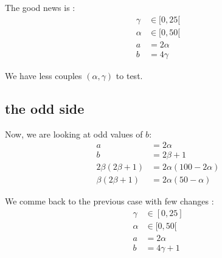 The good news is : 
\begin{equation}\label{eq:pow2:5}
\begin{split}
	\gamma &\in [0, 25[ \\
	\alpha &\in [0, 50[ \\
	a &= 2 \alpha \\
	b &= 4 \gamma
\end{split}
\end{equation}

We have less couples $(\alpha, \gamma)$ to test.

\subsection{the odd side}
Now, we are looking at odd values of $b$:
\begin{equation}\label{eq:pow2odd}
\begin{split}
	a &= 2 \alpha \\
	b &= 2 \beta + 1\\
	2 \beta(2 \beta + 1) &= 2 \alpha(100 - 2 \alpha) \\
	\beta(2\beta + 1) &= 2 \alpha(50 - \alpha)
\end{split}
\end{equation}

We comme back to the previous case with few changes :
\begin{equation}\label{eq:pow2:5}
\begin{split}
	\gamma &\in [0, 25] \\
	\alpha &\in [0, 50[ \\
	a &= 2 \alpha \\
	b &= 4 \gamma + 1
\end{split}
\end{equation}





